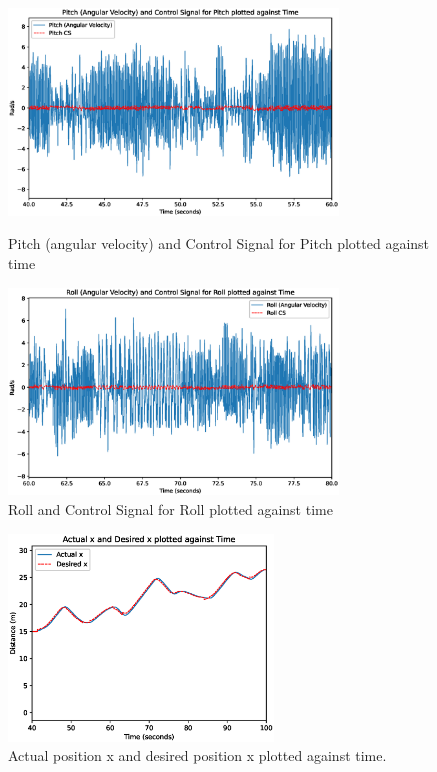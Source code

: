 \begin{figure}[H]
    \centering
    \begin{minipage}[b]{0.45\textwidth}
        \centering
        \includegraphics[height=5.5cm,keepaspectratio]{img/pitch_plot.eps}
        \caption{Pitch (angular velocity) and Control Signal for Pitch plotted against time}
        \label{fig:pitch_plot}
    \end{minipage}
    \hfill
    \begin{minipage}[b]{0.45\textwidth}
        \centering
        \includegraphics[height=5.5cm,keepaspectratio]{img/roll_plot.eps}
        \caption{Roll and Control Signal for Roll plotted against time}
        \label{fig:roll_plot}
    \end{minipage}
\end{figure}
\begin{figure}[H]
    \centering
    \begin{minipage}[b]{0.45\textwidth}
    \end{minipage}
    \hfill
    \begin{minipage}[b]{0.45\textwidth}
        \centering
        \includegraphics[height=5.5cm,keepaspectratio]{img/x_plot.eps}
        \caption{Actual position x and desired position x plotted against time.}
        \label{fig:x_plot}
    \end{minipage}
    \hfill
    \begin{minipage}[b]{0.45\textwidth}
    \end{minipage}
\end{figure}
